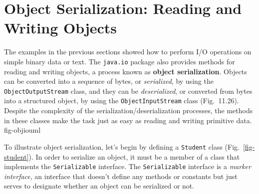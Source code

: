 
\section{Object Serialization: Reading and Writing Objects}


\noindent The examples in the previous sections showed how to perform I/O operations
on simple binary data or text.  The {\tt java.io} package also
provides methods for reading and writing objects, a process known as
{\bf object serialization}. Objects can be 
converted into a sequence of bytes, or {\it serialized}, by  using the
{\tt ObjectOutputStream} class, and they can be {\it deserialized}, or
converted from bytes into a structured object, by 
using the {\tt ObjectInputStream} class
(Fig.~11.26). Despite the complexity of the
serialization/deserialization processes, the methods in these classes
make the task just as easy as reading and writing primitive data.
{fig-objiouml}


To illustrate object serialization, let's begin by defining a
{\tt Student} class (Fig.~\ref{fig-student}).  In order to serialize an
object, it must be a member of a class that implements the
{\tt Serializable} interface.  The {\tt Serializable} interface is a {\it
marker interface}, an interface that doesn't define any methods or
constants but just serves to designate whether an object can be
serialized or not.


